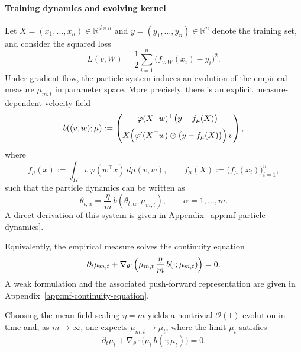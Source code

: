 \paragraph{Training dynamics and evolving kernel}

Let $X=(x_1,\dots,x_n)\in\mathbb R^{d\times n}$ and
$y=(y_1,\ldots,y_n)\in\mathbb R^n$ denote the training set, and consider the
squared loss
\[
	L(v,W)
	=
	\frac12\sum_{i=1}^n\bigl(f_{v,W}(x_i)-y_i\bigr)^2.
\]
Under gradient flow, the particle system induces an evolution of the empirical
measure $\mu_{m,t}$ in parameter space. More precisely, there is an explicit
measure-dependent velocity field
\[
	b((v,w);\mu)
	:=
	\begin{pmatrix}
		\varphi(X^\top w)^\top\bigl(y-f_\mu(X)\bigr) \\[2mm]
		X\Bigl(\varphi'(X^\top w)\odot\bigl(y-f_\mu(X)\bigr)\Bigr)\,v
	\end{pmatrix},
\]
where
\[
	f_\mu(x):=\int_\Omega v\,\varphi(w^\top x)\,d\mu(v,w),
	\qquad
	f_\mu(X):=\bigl(f_\mu(x_i)\bigr)_{i=1}^n,
\]
such that the particle dynamics can be written as
\[
	\dot\theta_{t,\alpha}
	=
	\frac{\eta}{m}\,b(\theta_{t,\alpha};\mu_{m,t}),
	\qquad \alpha=1,\dots,m.
\]
A direct derivation of this system is given in
Appendix~\ref{app:mf-particle-dynamics}.

Equivalently, the empirical measure solves the continuity equation
\begin{equation}
	\partial_t\mu_{m,t}
	+
	\nabla_\theta\!\cdot\!\Bigl(\mu_{m,t}\,\frac{\eta}{m}\,b(\cdot;\mu_{m,t})\Bigr)
	=
	0.
	\label{eq:mf-continuity-compact}
\end{equation}
A weak formulation and the associated push-forward representation are given in
Appendix~\ref{app:mf-continuity-equation}.

Choosing the mean-field scaling $\eta=m$ yields a nontrivial $\mathcal O(1)$
evolution in time and, as $m\to\infty$, one expects $\mu_{m,t}\to\mu_t$, where
the limit $\mu_t$ satisfies
\begin{equation}
	\partial_t\mu_t+\nabla_\theta\!\cdot\bigl(\mu_t\,b(\cdot;\mu_t)\bigr)=0.
	\label{eq:mf-continuity-with-initial-conditions}
\end{equation}


